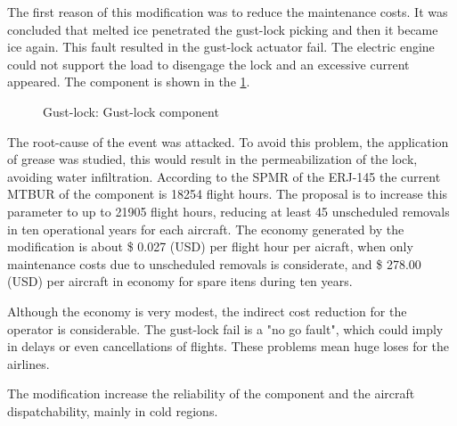 The first reason of this modification was to reduce the maintenance costs. It was concluded that melted ice penetrated the gust-lock picking and then it became ice again. This fault resulted in the gust-lock actuator fail. The electric engine could not support the load to disengage the lock and an excessive current appeared. The component is shown in the \ref{fig:GL}.

\begin{figure}[H] %
\caption{Gust-lock: Gust-lock component}
\label{fig:GL}
\end{figure}

The root-cause of the event was attacked. To avoid this problem, the application of grease was studied, this would result in the permeabilization of the lock, avoiding water infiltration.
According to the SPMR of the ERJ-145 the current MTBUR of the component is 18254 flight hours. The proposal is to increase this parameter to up to 21905 flight hours, reducing at least 45 unscheduled removals in ten operational years for each aircraft. The economy generated by the modification is about \$ 0.027 (USD) per flight hour per aicraft, when only maintenance costs due to unscheduled removals is considerate, and \$ 278.00 (USD) per aircraft in economy for spare itens during ten years.

Although the economy is very modest, the indirect cost reduction for the operator is considerable. The gust-lock fail is a "no go fault", which could imply in delays or even cancellations of flights. These problems mean huge loses for the airlines.

The modification increase the reliability of the component and the aircraft dispatchability, mainly in cold regions.
